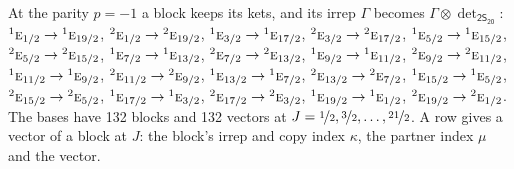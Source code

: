 \documentclass[10pt,a4paper]{article}
\numberwithin{equation}{section}
\newcommand{\grp}[1]{\mathsf{#1}}
\newcommand{\irr}[1]{\text{\normalfont\scshape #1}}
\newcommand{\conjpair}[1]{{}^{#1}}
\newcommand{\irrprod}{\otimes}
\newcommand{\mult}{\kappa}
\newcommand{\intx}{\mu}
\begin{document}
At the parity $p = -1$ a block keeps its kets, and its irrep $\Gamma$ becomes $\Gamma \irrprod \det_{\grp{2S_{20}}}$: $\conjpair{1}\irr{e}_{1/2} \to \conjpair{1}\irr{e}_{19/2}$, $\conjpair{2}\irr{e}_{1/2} \to \conjpair{2}\irr{e}_{19/2}$, $\conjpair{1}\irr{e}_{3/2} \to \conjpair{1}\irr{e}_{17/2}$, $\conjpair{2}\irr{e}_{3/2} \to \conjpair{2}\irr{e}_{17/2}$, $\conjpair{1}\irr{e}_{5/2} \to \conjpair{1}\irr{e}_{15/2}$, $\conjpair{2}\irr{e}_{5/2} \to \conjpair{2}\irr{e}_{15/2}$, $\conjpair{1}\irr{e}_{7/2} \to \conjpair{1}\irr{e}_{13/2}$, $\conjpair{2}\irr{e}_{7/2} \to \conjpair{2}\irr{e}_{13/2}$, $\conjpair{1}\irr{e}_{9/2} \to \conjpair{1}\irr{e}_{11/2}$, $\conjpair{2}\irr{e}_{9/2} \to \conjpair{2}\irr{e}_{11/2}$, $\conjpair{1}\irr{e}_{11/2} \to \conjpair{1}\irr{e}_{9/2}$, $\conjpair{2}\irr{e}_{11/2} \to \conjpair{2}\irr{e}_{9/2}$, $\conjpair{1}\irr{e}_{13/2} \to \conjpair{1}\irr{e}_{7/2}$, $\conjpair{2}\irr{e}_{13/2} \to \conjpair{2}\irr{e}_{7/2}$, $\conjpair{1}\irr{e}_{15/2} \to \conjpair{1}\irr{e}_{5/2}$, $\conjpair{2}\irr{e}_{15/2} \to \conjpair{2}\irr{e}_{5/2}$, $\conjpair{1}\irr{e}_{17/2} \to \conjpair{1}\irr{e}_{3/2}$, $\conjpair{2}\irr{e}_{17/2} \to \conjpair{2}\irr{e}_{3/2}$, $\conjpair{1}\irr{e}_{19/2} \to \conjpair{1}\irr{e}_{1/2}$, $\conjpair{2}\irr{e}_{19/2} \to \conjpair{2}\irr{e}_{1/2}$.
The bases have 132 blocks and 132 vectors at $J = \nicefrac{1}{2}, \nicefrac{3}{2}, \dots, \nicefrac{21}{2}$. \label{n:index.copy}\label{n:head.vector}A row gives a vector of a block at $J$: the block's irrep and copy index $\mult$, the partner index $\intx$ and the vector.
\end{document}
